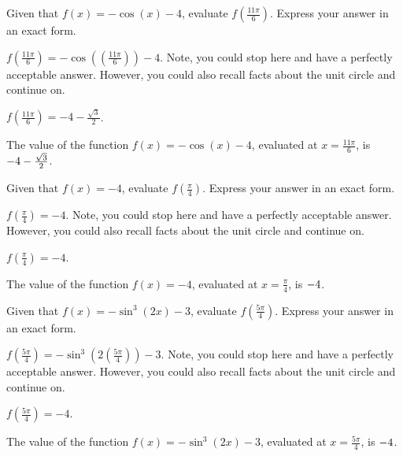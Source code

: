 \begin{shuffle}
\begin{exercise}
Given that $f(x)=-\cos (x)-4$, evaluate $f(\frac{11 \pi }{6})$. Express your answer in an exact form.
\begin{solution}
\begin{hint}
$f(\frac{11 \pi }{6})=-\cos ((\frac{11 \pi }{6}))-4$. Note, you could stop here and have a perfectly acceptable answer. However, you could also recall facts about the unit circle and continue on. 
\end{hint}
\begin{hint}
$f(\frac{11 \pi }{6})=-4-\frac{\sqrt{3}}{2}$.
\end{hint}
The value of the function $f(x) = -\cos (x)-4$, evaluated at $x=\frac{11 \pi }{6}$, is ${-4-\frac{\sqrt{3}}{2}}$.
\end{solution}
\end{exercise}

\begin{exercise}
Given that $f(x)=-4$, evaluate $f(\frac{\pi }{4})$. Express your answer in an exact form.
\begin{solution}
\begin{hint}
$f(\frac{\pi }{4})=-4$. Note, you could stop here and have a perfectly acceptable answer. However, you could also recall facts about the unit circle and continue on. 
\end{hint}
\begin{hint}
$f(\frac{\pi }{4})=-4$.
\end{hint}
The value of the function $f(x) = -4$, evaluated at $x=\frac{\pi }{4}$, is ${-4}$.
\end{solution}
\end{exercise}

\begin{exercise}
Given that $f(x)=-\sin ^3(2 x)-3$, evaluate $f(\frac{5 \pi }{4})$. Express your answer in an exact form.
\begin{solution}
\begin{hint}
$f(\frac{5 \pi }{4})=-\sin ^3(2 (\frac{5 \pi }{4}))-3$. Note, you could stop here and have a perfectly acceptable answer. However, you could also recall facts about the unit circle and continue on. 
\end{hint}
\begin{hint}
$f(\frac{5 \pi }{4})=-4$.
\end{hint}
The value of the function $f(x) = -\sin ^3(2 x)-3$, evaluated at $x=\frac{5 \pi }{4}$, is ${-4}$.
\end{solution}
\end{exercise}


\end{shuffle}
